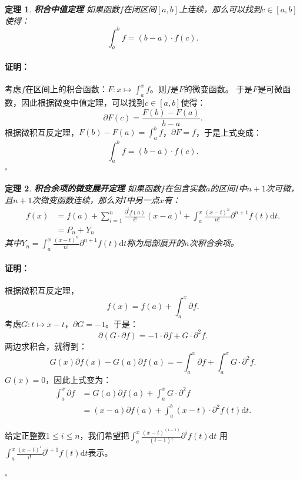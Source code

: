 \documentclass[12pt,UTF8]{ctexbook}
\renewenvironment{proof}{\paragraph{\textbf{证明：}}}{\hfill$\square$}
\newtheorem{tm}{定理}[section]
\begin{document}
\begin{appendix}
\begin{tm}{\textbf{积合中值定理}}
    如果函数$f$在闭区间$[a,b]$上连续，那么可以找到$c\in[a,b]$使得：
    $$ \int_a^b f = (b - a)\cdot f(c).$$
\end{tm}

\begin{proof}
    考虑$f$在区间上的积合函数：$F: x\mapsto \int_a^x f$。则$f$是$F$的微变函数。
    于是$F$是可微函数，因此根据微变中值定理，可以找到$c\in[a,b]$使得：
    $$ \partial F(c) = \frac{F(b) - F(a)}{b - a}.$$
    根据微积互反定理，$F(b) - F(a) = \int_a^b f$，$\partial F = f$，于是上式变成：
    $$ \int_a^b f = (b - a)\cdot f(c).$$
\end{proof}


\begin{tm}{\textbf{积合余项的微变展开定理}}
    如果函数$f$在包含实数$a$的区间$I$中$n+1$次可微，且$n+1$次微变函数连续，那么对$I$中另一点$x$有：
    \begin{align*}
        f(x) &= f(a) + \sum_{i=1}^n \frac{\partial^i f(a)}{i!} (x - a)^i + \int_a^x \frac{(x - t)^{n}}{n!} \partial^{n+1} f(t)\mathrm{d}t. \\
        &= P_n + Y_n 
    \end{align*}
    其中$Y_n = \int_a^x \frac{(x - t)^{n}}{n!} \partial^{n+1} f(t)\mathrm{d}t$称为局部展开的$n$次积合余项。
\end{tm}

\begin{proof}
    根据微积互反定理，
    $$ f(x) = f(a) + \int_a^x \partial f .$$
    考虑$G : t \mapsto x - t $，$\partial G = -1$。于是：
    $$ \partial (G\cdot \partial f) = -1 \cdot \partial f + G \cdot \partial^2 f. $$
    两边求积合，就得到：
    $$ G(x) \partial f(x) - G(a) \partial f(a) = - \int_a^x \partial f + \int_a^x G \cdot \partial^2 f. $$
    $G(x) = 0$，因此上式变为：
    \begin{align*}
        \int_a^x \partial f &=  G(a) \partial f(a) + \int_a^x G \cdot \partial^2 f \\
        &= (x - a) \partial f(a) + \int_a^b (x - t) \cdot \partial^2 f(t)\mathrm{d}t. 
    \end{align*}
    
    给定正整数$1\leqslant i \leqslant n$，我们希望把$\int_a^x \frac{(x - t)^{(i-1)}}{(i-1)!} \partial^{i} f(t)\mathrm{d}t$
    用$\int_a^x \frac{(x - t)^{i}}{i!} \partial^{i+1} f(t)\mathrm{d}t$表示。


\end{proof}
\end{appendix}
\end{document}
